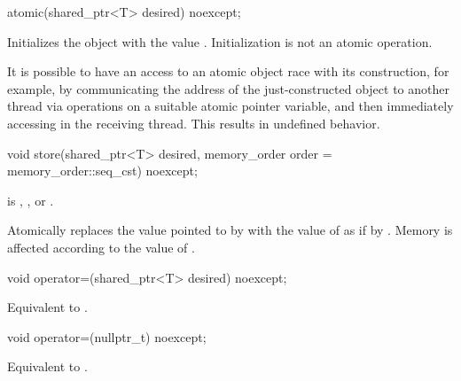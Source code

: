 %
\begin{itemdecl}
atomic(shared_ptr<T> desired) noexcept;
\end{itemdecl}

\begin{itemdescr}
\pnum
\effects
Initializes the object with the value .
Initialization is not an atomic operation.
\begin{note}
It is possible to have an access to
an atomic object  race with its construction,
for example,
by communicating the address of the just-constructed object 
to another thread via  operations
on a suitable atomic pointer variable, and
then immediately accessing  in the receiving thread.
This results in undefined behavior.
\end{note}
\end{itemdescr}

%
\begin{itemdecl}
void store(shared_ptr<T> desired, memory_order order = memory_order::seq_cst) noexcept;
\end{itemdecl}

\begin{itemdescr}
\pnum
\expects
{} is
,
, or
.

\pnum
\effects
Atomically replaces the value pointed to by  with
the value of  as if by .
Memory is affected according to the value of .
\end{itemdescr}

%
\begin{itemdecl}
void operator=(shared_ptr<T> desired) noexcept;
\end{itemdecl}

\begin{itemdescr}
\pnum
\effects
Equivalent to .
\end{itemdescr}

%
\begin{itemdecl}
void operator=(nullptr_t) noexcept;
\end{itemdecl}

\begin{itemdescr}
\pnum
\effects
Equivalent to .
\end{itemdescr}

